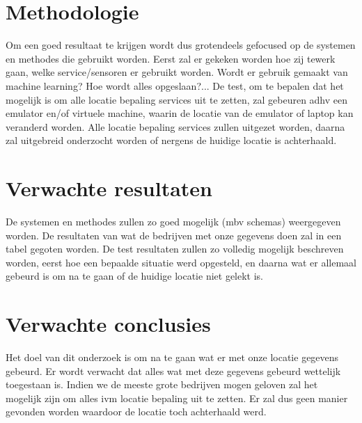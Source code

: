 \section{Methodologie}
\label{sec:methodologie}

Om een goed resultaat te krijgen wordt dus grotendeels gefocused op de systemen en methodes die gebruikt worden. Eerst zal er gekeken worden hoe zij tewerk gaan, welke service/sensoren er gebruikt worden. Wordt er gebruik gemaakt van machine learning? Hoe wordt alles opgeslaan?...
De test, om te bepalen dat het mogelijk is om alle locatie bepaling services uit te zetten, zal gebeuren adhv een emulator en/of virtuele machine, waarin de locatie van de emulator of laptop kan veranderd worden. Alle locatie bepaling services zullen uitgezet worden, daarna zal uitgebreid onderzocht worden of nergens de huidige locatie is achterhaald.


\section{Verwachte resultaten}
\label{sec:verwachte_resultaten}
De systemen en methodes zullen zo goed mogelijk (mbv schemas) weergegeven worden.
De resultaten van wat de bedrijven met onze gegevens doen zal in een tabel gegoten worden.
De test resultaten zullen zo volledig mogelijk beschreven worden, eerst hoe een bepaalde situatie werd opgesteld, en daarna wat er allemaal gebeurd is om na te gaan of de huidige locatie niet gelekt is.


\section{Verwachte conclusies}
\label{sec:verwachte_conclusies}
Het doel van dit onderzoek is om na te gaan wat er met onze locatie gegevens gebeurd. 
Er wordt verwacht dat alles wat met deze gegevens gebeurd wettelijk toegestaan is.
Indien we de meeste grote bedrijven mogen geloven zal het mogelijk zijn om alles ivm locatie bepaling uit te zetten.
Er zal dus geen manier gevonden worden waardoor de locatie toch achterhaald werd.


